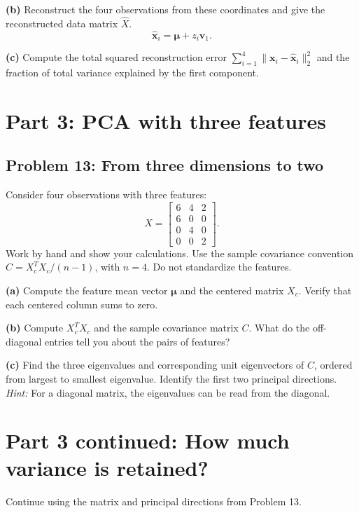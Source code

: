 \documentclass[12pt,letterpaper]{article}
\begin{document}
\textbf{(b)} 
Reconstruct the four observations from these coordinates and give the reconstructed data matrix $\widehat X$.
\[
\widehat{\mathbf x}_i=\boldsymbol\mu+z_i\mathbf v_1.
\]
\vspace{1.85in}

\textbf{(c)} Compute the total squared reconstruction error
$\sum_{i=1}^{4}\|\mathbf x_i-\widehat{\mathbf x}_i\|_2^2$ and the fraction of
total variance explained by the first component.
\vspace{0.85in}


\newpage
\section*{Part 3: PCA with three features}
\subsection*{Problem 13: From three dimensions to two}
Consider four observations with three features:
\[
X=\begin{bmatrix}
6&4&2\\
6&0&0\\
0&4&0\\
0&0&2
\end{bmatrix}.
\]
Work by hand and show your calculations. Use the sample covariance convention
$C=X_c^TX_c/(n-1)$, with $n=4$. Do not standardize the features.

\textbf{(a)} Compute the feature mean vector $\boldsymbol\mu$ and the centered
matrix $X_c$. Verify that each centered column sums to zero.
\vspace{1.35in}

\textbf{(b)} Compute $X_c^TX_c$ and the sample covariance matrix $C$.
What do the off-diagonal entries tell you about the pairs of features?
\vspace{1.45in}

\textbf{(c)} Find the three eigenvalues and corresponding unit eigenvectors
of $C$, ordered from largest to smallest eigenvalue. Identify the first two
principal directions. \textit{Hint:} For a diagonal matrix, the eigenvalues
can be read from the diagonal.

\newpage
\section*{Part 3 continued: How much variance is retained?}
Continue using the matrix and principal directions from Problem 13.
\end{document}
